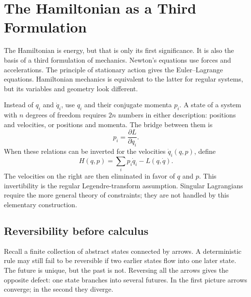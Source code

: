 \begin{classroomqa}
\end{classroomqa}

\section{The Hamiltonian as a Third Formulation}

The Hamiltonian is energy, but that is only its first significance.  It is
also the basis of a third formulation of mechanics.  Newton's equations use
forces and accelerations.  The principle of stationary action gives the
Euler--Lagrange equations.  Hamiltonian mechanics is equivalent to the latter
for regular systems, but its variables and geometry look different.

Instead of \(q_i\) and \(\dot q_i\), use \(q_i\) and their conjugate momenta
\(p_i\).  A state of a system with \(n\) degrees of freedom requires \(2n\)
numbers in either description: positions and velocities, or positions and
momenta.  The bridge between them is
\begin{equation}
  p_i=\frac{\partial L}{\partial\dot q_i}.
  \label{eq:l6-legendre-map}
\end{equation}
When these relations can be inverted for the velocities
\(\dot q_i(q,p)\), define
\begin{equation}
  H(q,p)=\sum_i p_i\dot q_i-L(q,\dot q).
  \label{eq:l6-hamiltonian-definition}
\end{equation}
The velocities on the right are then eliminated in favor of \(q\) and \(p\).
This invertibility is the regular Legendre-transform assumption.  Singular
Lagrangians require the more general theory of constraints; they are not
handled by this elementary construction.

\subsection{Reversibility before calculus}

Recall a finite collection of abstract states connected by arrows.  A
deterministic rule may still fail to be reversible if two earlier states flow
into one later state.  The future is unique, but the past is not.  Reversing
all the arrows gives the opposite defect: one state branches into several
futures.  In the first picture arrows converge; in the second they diverge.

